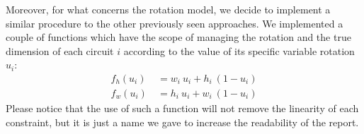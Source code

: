     Moreover, for what concerns the rotation model, we decide to implement a similar procedure to the
    other previously seen approaches. We implemented a couple of functions which have the scope of 
    managing the rotation and the true dimension of each circuit \(i\) according to the value of its 
    specific variable rotation \(u_i\):
    \begin{subequations}
        \label{ilp:f_dims}
        \begin{align}
            f_h(u_i) &\ = w_i \ u_i + h_i \ (1 - u_i)\\
            f_w(u_i) &\ = h_i \ u_i + w_i \ (1 - u_i)
        \end{align}    
    \end{subequations}
    Please notice that the use of such a function will not remove the linearity of each constraint,
    but it is just a name we gave to increase the readability of the report. 
